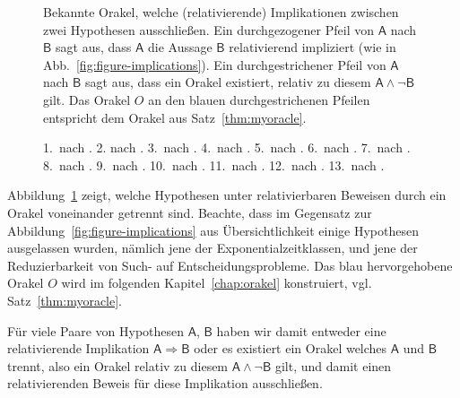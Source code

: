 \begin{figure}[p]
{       Bekannte Orakel, welche (relativierende) Implikationen zwischen zwei Hypothesen ausschließen. Ein durchgezogener Pfeil von $\mathsf A$ nach $\mathsf B$ sagt aus, dass $\mathsf A$ die Aussage $\mathsf B$ relativierend impliziert (wie in Abb.~\ref{fig:figure-implications}). Ein durchgestrichener Pfeil von $\mathsf A$ nach $\mathsf B$ sagt aus, dass ein Orakel existiert, relativ zu diesem $\mathsf A\land\neg\mathsf B$ gilt. Das Orakel $O$ an den blauen durchgestrichenen Pfeilen entspricht dem Orakel aus Satz~\ref{thm:myoracle}.\par
    1.~nach \textcite[Thm.~5]{rackoff_relativized_1982}. 
    2. nach \textcite[Thm.~4.1]{dose_further_2020}.
    3.~nach \textcite[Thm.~9]{ehrmanntraut_oracle_2022}.
    4.~nach \textcite[Thm.~4.1]{dose_np-completeness_2019}.
    5.~nach \textcite[Cor.~3.3]{dose_oracle_2020}.
    6.~nach \textcite[Thm.~3.2]{dose_further_2020}.
    7.~nach \textcite[Thm.~3.2]{fortnow_separability_2002}.
    8.~nach \textcite[Thm.~12.3]{fenner_inverting_2003}.
    9.~nach \textcite[Cor.~6.6]{glaser_disjoint_2004}.
    10.~nach \textcite[Thm.~5.1]{khaniki_new_2022}.
    11.~nach \textcite[Thm.~5.2]{khaniki_new_2022}.
    12.~nach \textcite[Satz~3.12]{dingel_separation_2022}.
    13.~nach \textcite[Cor.~6.34]{glaser_disjoint_2004}.
}\label{fig:oracles}
    \forcerectofloat
\end{figure}


Abbildung~\ref{fig:oracles} zeigt, welche Hypothesen unter relativierbaren Beweisen durch ein Orakel voneinander getrennt sind.
Beachte, dass im Gegensatz zur Abbildung~\ref{fig:figure-implications} aus Übersichtlichkeit einige Hypothesen ausgelassen wurden, nämlich jene der Exponentialzeitklassen, und jene der Reduzierbarkeit von Such- auf Entscheidungsprobleme.
Das blau hervorgehobene Orakel $O$ wird im folgenden Kapitel~\ref{chap:orakel} konstruiert, vgl. Satz~\ref{thm:myoracle}.

Für viele Paare von Hypothesen $\mathsf{A}$, $\mathsf{B}$ haben wir damit entweder eine relativierende Implikation $\mathsf{A}\Rightarrow\mathsf{B}$ oder es existiert ein Orakel welches $\mathsf{A}$ und $\mathsf{B}$ trennt,  also ein Orakel relativ zu diesem $\mathsf{A}\land \neg\mathsf{B}$ gilt, und damit einen relativierenden Beweis für diese Implikation ausschließen. 

